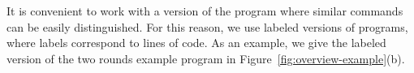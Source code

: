 
 It is convenient to work with a version of the program where similar commands can be easily distinguished. For this reason, we use labeled versions of programs, where labels correspond to lines of code. As an example, we give the labeled version of the two rounds example program in Figure~\ref{fig:overview-example}(b).


